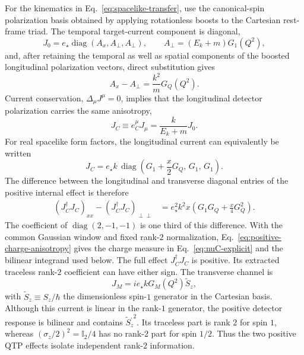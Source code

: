 \documentclass[12pt]{iopjournal}
\newcommand{\diag}{\operatorname{diag}}
\theoremstyle{definition}
\theoremstyle{remark}
\begin{document}
For the kinematics in Eq.~\eqref{eq:spacelike-transfer}, use the canonical-spin polarization basis obtained by applying rotationless boosts to the Cartesian rest-frame triad. The temporal target-current component is diagonal,
\begin{equation}
J_0=e_\star\diag(A_x,A_\perp,A_\perp),
\qquad
A_\perp=(E_k+m)G_1(Q^2),
\end{equation}
and, after retaining the temporal as well as spatial components of the boosted longitudinal polarization vectors, direct substitution gives
\begin{equation}
\boxed{A_x-A_\perp=\frac{k^2}{m}G_Q(Q^2).}
\label{eq:charge-anisotropy}
\end{equation}
Current conservation, $\Delta_\mu J^\mu=0$, implies that the longitudinal detector polarization carries the same anisotropy,
\begin{equation}
\boxed{J_C\equiv e_C^\mu J_\mu=\frac{k}{E_k+m}J_0.}
\end{equation}
For real spacelike form factors, the longitudinal current can equivalently be written
\begin{equation}
J_C=e_\star k\,\diag\!\left(G_1+\frac{x}{2}G_Q,\,G_1,\,G_1\right).
\label{eq:longitudinal-explicit}
\end{equation}
The difference between the longitudinal and transverse diagonal entries of the positive internal effect is therefore
\begin{align}
(J_C^\dagger J_C)_{xx}-(J_C^\dagger J_C)_{\perp\perp}
&=e_\star^2 k^2x\left(G_1G_Q+\frac{x}{4}G_Q^2\right).
\label{eq:positive-charge-anisotropy}
\end{align}
The coefficient of $\diag(2,-1,-1)$ is one third of this difference. With the common Gaussian window and fixed rank-$2$ normalization, Eq.~\eqref{eq:positive-charge-anisotropy} gives the charge measure in Eq.~\eqref{eq:nuC-explicit} and the bilinear integrand used below. The full effect $J_C^\dagger J_C$ is positive. Its extracted traceless rank-$2$ coefficient can have either sign.
The transverse channel is
\begin{equation}
\boxed{J_M=i e_\star k G_M(Q^2)\widetilde S_z,}
\end{equation}
with $\widetilde S_z\equiv S_z/\hbar$ the dimensionless spin-$1$ generator in the Cartesian basis. Although this current is linear in the rank-$1$ generator, the positive detector response is bilinear and contains $\widetilde S_z^{,2}$. Its traceless part is rank $2$ for spin $1$, whereas $(\sigma_z/2)^2=\mathbb I_2/4$ has no rank-$2$ part for spin $1/2$. Thus the two positive QTP effects isolate independent rank-$2$ information.
\end{document}
